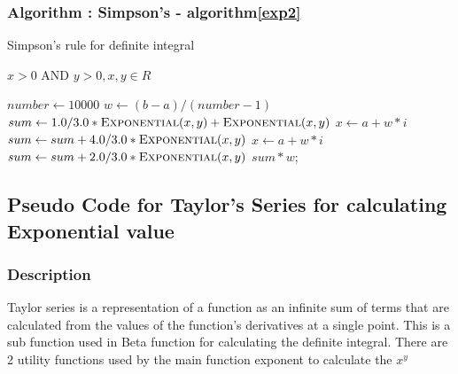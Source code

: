 \documentclass[letterpaper, 11pt]{article}
\begin{document}
            \subsubsection{Algorithm : Simpson's - algorithm\ref{exp2}}
                \begin{algorithm}
                    \caption{Simpson's rule for definite integral}\label{exp2}
                    \begin{algorithmic}[1]
                        \Require $x > 0$ AND $y > 0, x, y \in R$
                        
                              \State $number \gets 10000$  
                              \State $w \gets (b - a) / (number - 1)$ 
                              \State $sum \gets 1.0 / 3.0 * \Call{Exponential}{x,y} + \Call{Exponential}{x,y}$
                                 \State $x \gets a + w * i$
                                 \State $sum \gets sum + 4.0 / 3.0 * \Call{Exponential}{x,y}$
                              \EndFor
                                 \State $x \gets a + w * i$
                                 \State $sum \gets sum + 2.0 / 3.0 * \Call{Exponential}{x,y}$
                              \EndFor
                              \Return $sum * w$;
                
                        \EndFunction
                    \end{algorithmic}
                \end{algorithm}
                
    \subsection{Pseudo Code for Taylor's Series for calculating Exponential value}
            \subsubsection{Description}
            Taylor series is a representation of a function as an infinite sum of terms that are calculated from the values of the function's derivatives at a single point.
            This is a sub function used in Beta function for calculating the definite integral. There are 2 utility functions used by the main function exponent to calculate the $x^y$ 
\end{document}
